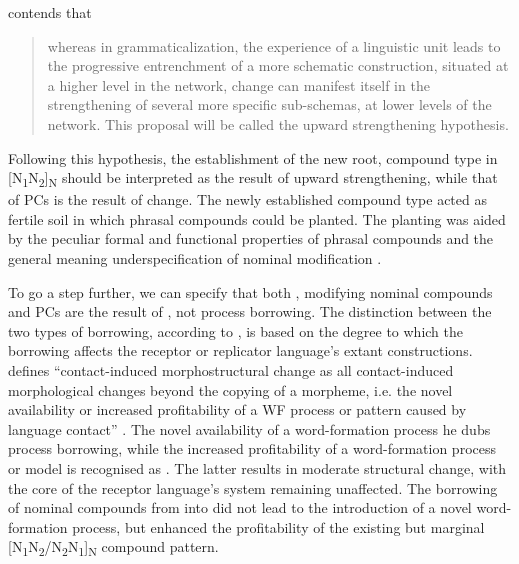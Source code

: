 \documentclass[output=paper]{LSP/langsci}
\begin{document}
\citet[116]{Hilpert2015} contends that 
\begin{quotation}
whereas in grammaticalization, the experience of a linguistic unit leads to the progressive entrenchment of a more schematic construction, situated at a higher level in the  network,  change can manifest itself in the strengthening of several more specific sub-schemas, at lower levels of the  network. This proposal will be called the upward strengthening hypothesis. 
\end{quotation}
  
  Following this hypothesis, the establishment of the new root,  compound type in  [N\textsubscript{1}N\textsubscript{2}]\textsubscript{N} should be interpreted as the result of upward strengthening, while that of PCs is the result of  change. The newly established compound type acted as fertile soil in which phrasal compounds could be planted. The planting was aided by the peculiar formal and functional properties of phrasal compounds and the general meaning underspecification of nominal modification  \citep{Bauer2013}. 

To go a step further, we can specify that both , modifying nominal compounds and PCs are the result of , not process borrowing. The distinction between the two types of borrowing, according to \citet{Renner2015}, is based on the degree to which the borrowing affects the receptor or replicator language’s extant constructions. \citeauthor{Renner2015} defines “contact-induced morphostructural change as all contact-induced morphological changes beyond the copying of a morpheme, i.e. the novel availability or increased profitability of a WF process or pattern caused by language contact” \citep{Renner2016}. The novel availability of a word-formation process he dubs process borrowing, while the increased profitability of a word-formation process or model is recognised as . The latter results in moderate structural change, with the core of the receptor language’s system remaining unaffected. The borrowing of  nominal compounds from  into  did not lead to the introduction of a novel word-formation process, but enhanced the profitability of the existing but marginal [N\textsubscript{1}N\textsubscript{2}/N\textsubscript{2}N\textsubscript{1}]\textsubscript{N} compound pattern.
\end{document}
